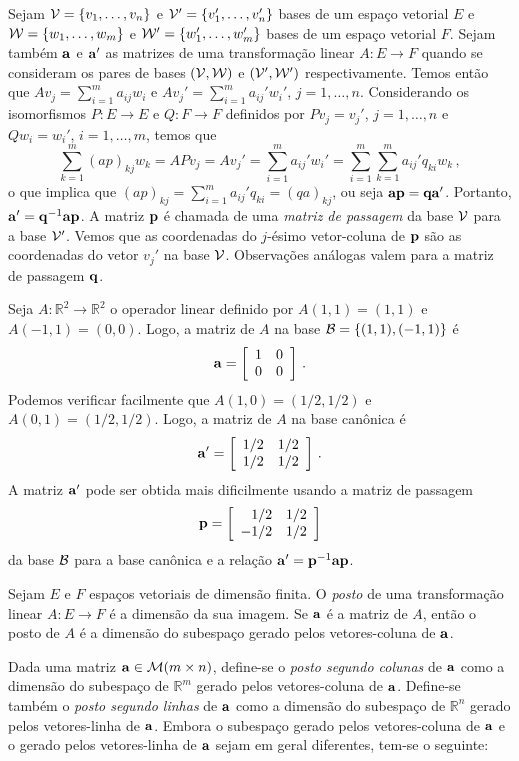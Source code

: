 \documentclass[12pt,a4paper]{article}
\newcommand{\dsqr}[1]{\left[#1\right]}
\newcommand{\R}{\mathbb{R}}
\theoremstyle{definition}
\begin{document}
Sejam ${\cal V}=\{v_1,\ldots,v_n\}$ e ${\cal V}'=\{v_1',\ldots,v_n'\}$
bases de um espaço vetorial $E$ e ${\cal W}=\{w_1,\ldots,w_m\}$ e
${\cal W}'=\{w_1',\ldots,w_m'\}$ bases de um espaço vetorial
$F$. Sejam também ${\bf a}$ e ${\bf a}'$ as matrizes de uma
transformação linear $A:E\to F$ quando se consideram os pares de bases
$({\cal V},{\cal W})$ e $({\cal V}',{\cal W}')$ respectivamente. Temos
então que $Av_j=\sum_{i=1}^ma_{ij}w_i$ e
$Av_j'=\sum_{i=1}^ma_{ij}'w_i'$, $j=1,\ldots,n$. Considerando os
isomorfismos $P:E\to E$ e $Q:F\to F$ definidos por $Pv_j=v_j'$,
$j=1,\ldots,n$ e $Qw_i=w_i'$, $i=1,\ldots,m$, temos que
$$\sum_{k=1}^m(ap)_{kj}w_k=APv_j=Av_j'=\sum_{i=1}^ma_{ij}'w_i'=\sum_{i=1}^m\sum_{k=1}^ma_{ij}'q_{ki}w_k\,,$$
o que implica que $(ap)_{kj}=\sum_{i=1}^ma_{ij}'q_{ki}=(qa)_{kj}$, ou
seja ${\bf ap}={\bf qa}'$. Portanto, ${\bf a}'={\bf q}^{-1}{\bf
  ap}$. A matriz ${\bf p}$ é chamada de uma \textit{matriz de
  passagem} da base ${\cal V}$ para a base ${\cal V}'$. Vemos que as
coordenadas do $j$-ésimo vetor-coluna de ${\bf p}$ são as coordenadas
do vetor $v_j'$ na base ${\cal V}$. Observações análogas valem para a
matriz de passagem ${\bf q}$.

Seja $A:\R^2\to\R^2$ o operador linear definido por $A(1,1)=(1,1)$ e
$A(-1,1)=(0,0)$. Logo, a matriz de $A$ na base
${\cal B}=\{(1,1),(-1,1)\}$ é
$${\bf a}=\dsqr{
  \begin{array}{cc}
    1&0\\
    0&0
  \end{array}
}\,.$$ Podemos verificar facilmente que $A(1,0)=(1/2,1/2)$ e
$A(0,1)=(1/2,1/2)$. Logo, a matriz de $A$ na base canônica é
$${\bf a}'=\dsqr{
\begin{array}{cc}
  1/2&1/2\\
  1/2&1/2
\end{array}
}\,.
$$
A matriz ${\bf a}'$ pode ser obtida mais dificilmente usando a matriz
de passagem
$${\bf p}=\dsqr{
  \begin{array}{rc}
    1/2&1/2\\
    -1/2&1/2
  \end{array}
}$$ da base ${\cal B}$ para a base canônica e a relação
${\bf a}'={\bf p}^{-1}{\bf ap}$.

Sejam $E$ e $F$ espaços vetoriais de dimensão finita. O \textit{posto}
de uma transformação linear $A:E\to F$ é a dimensão da sua imagem. Se
${\bf a}$ é a matriz de $A$, então o posto de $A$ é a dimensão do
subespaço gerado pelos vetores-coluna de ${\bf a}$.

Dada uma matriz ${\bf a}\in{\cal M}(m\times n)$, define-se o
\textit{posto segundo colunas} de ${\bf a}$ como a dimensão do
subespaço de $\R^m$ gerado pelos vetores-coluna de ${\bf
  a}$. Define-se também o \textit{posto segundo linhas} de ${\bf a}$
como a dimensão do subespaço de $\R^n$ gerado pelos vetores-linha de
${\bf a}$. Embora o subespaço gerado pelos vetores-coluna de ${\bf a}$
e o gerado pelos vetores-linha de ${\bf a}$ sejam em geral diferentes,
tem-se o seguinte:
\end{document}

